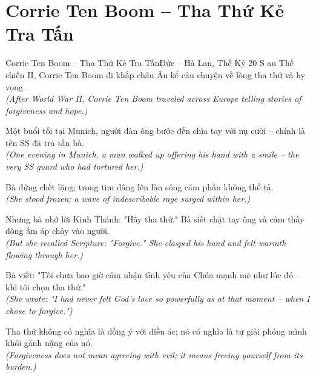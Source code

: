 \section{Corrie Ten Boom -- Tha Thứ Kẻ Tra Tấn}
\begin{truyen}{Corrie Ten Boom -- Tha Thứ Kẻ Tra Tấn}{Đức -- Hà Lan, Thế Kỷ 20}
S au Thế chiến II, Corrie Ten Boom đi khắp châu Âu kể câu chuyện về lòng tha thứ và hy vọng.\\
\textit{(After World War II, Corrie Ten Boom traveled across Europe telling stories of forgiveness and hope.)}

Một buổi tối tại Munich, người đàn ông bước đến chìa tay với nụ cười -- chính là tên SS đã tra tấn bà.\\
\textit{(One evening in Munich, a man walked up offering his hand with a smile -- the very SS guard who had tortured her.)}

Bà đứng chết lặng; trong tim dâng lên làn sóng căm phẫn không thể tả.\\
\textit{(She stood frozen; a wave of indescribable rage surged within her.)}

Nhưng bà nhớ lời Kinh Thánh: "Hãy tha thứ." Bà siết chặt tay ông và cảm thấy dòng ấm áp chảy vào người.\\
\textit{(But she recalled Scripture: "Forgive." She clasped his hand and felt warmth flowing through her.)}

Bà viết: "Tôi chưa bao giờ cảm nhận tình yêu của Chúa mạnh mẽ như lúc đó -- khi tôi chọn tha thứ."\\
\textit{(She wrote: "I had never felt God's love so powerfully as at that moment -- when I chose to forgive.")}

\end{truyen}
\begin{baihoc}
  Tha thứ không có nghĩa là đồng ý với điều ác; nó có nghĩa là tự giải phóng mình khỏi gánh nặng của nó.\\
  \textit{(Forgiveness does not mean agreeing with evil; it means freeing yourself from its burden.)}
\end{baihoc}

